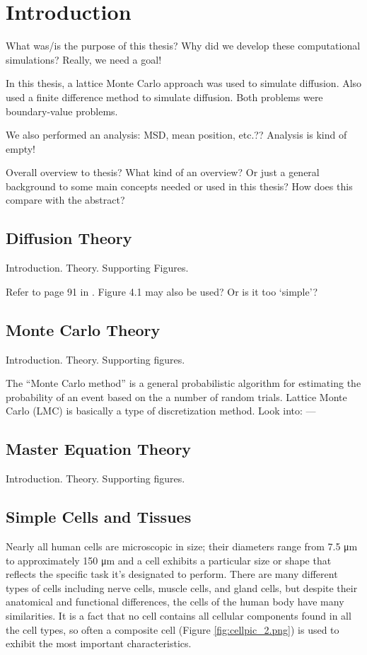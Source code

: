\chapter{Introduction}

What was/is the purpose of this thesis? Why did we develop these computational simulations? Really, we need a goal!

In this thesis, a lattice Monte Carlo approach was used to simulate diffusion. Also used a finite difference method to simulate diffusion. Both problems were boundary-value problems.

We also performed an analysis: MSD, mean position, etc.?? Analysis is kind of empty!

Overall overview to thesis? What kind of an overview? Or just a general background to some main concepts needed or used in this thesis? How does this compare with the abstract?
	
\section{Diffusion Theory}
\label{sec:intro-diffusion}
Introduction.
Theory.
Supporting Figures.

Refer to page 91 in \citep{ap}. Figure 4.1 may also be used? Or is it too `simple'?

\section{Monte Carlo Theory}
Introduction.
Theory.
Supporting figures.

The ``Monte Carlo method'' is a general probabilistic algorithm for estimating the probability of an event based on the a number of random trials.
Lattice Monte Carlo (LMC) is basically a type of discretization method.
Look into:
---

\section{Master Equation Theory}
Introduction.
Theory.
Supporting figures.

\section{Simple Cells and Tissues}

Nearly all human cells are microscopic in size; their diameters range from 7.5 \si{\micro\meter} to approximately 150 \si{\micro\meter} and a cell exhibits a particular size or shape that reflects the specific task it's designated to perform. There are many different types of cells including nerve cells, muscle cells, and gland cells, but despite their anatomical and functional differences, the cells of the human body have many similarities. It is a fact that no cell contains all cellular components found in all the cell types, so often a composite cell (Figure {\ref{fig:cellpic_2.png}}) is used to exhibit the most important characteristics. 

